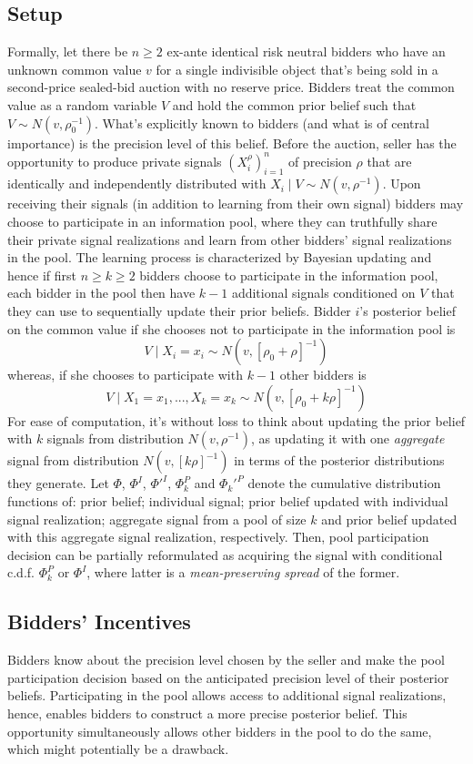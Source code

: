 \subsection*{Setup}
Formally, let there be $n \geq 2$ ex-ante identical risk neutral bidders who have an unknown common value $v$ for a single indivisible object that's being sold in a second-price sealed-bid auction with no reserve price. Bidders treat the common value as a random variable $V$ and hold the common prior belief such that $V \sim N(v,\rho_{0}^{-1})$. What's explicitly known to bidders (and what is of central importance) is the precision level of this belief. Before the auction, seller has the opportunity to produce private signals $(X_{i}^\rho)_{i=1}^n$ of precision $\rho$ that are identically and independently distributed with  $X_i \mid V \sim N(v,\rho^{-1})$. Upon receiving their signals (in addition to learning from their own signal) bidders may choose to participate in an information pool, where they can truthfully share their private signal realizations and learn from other bidders' signal realizations in the pool. The learning process is characterized by Bayesian updating and hence if first $n \geq k \geq 2$ bidders choose to participate in the information pool, each bidder in the pool then have $k-1$ additional signals conditioned on $V$ that they can use to sequentially update their prior beliefs. Bidder $i$'s posterior belief on the common value if she chooses not to participate in the information pool is
\[V \mid X_i=x_i \sim N(v,[\rho_0 + \rho]^{-1})\] 
whereas, if she chooses to participate with $k-1$ other bidders is
\[V \mid X_1=x_1,...,X_k=x_k \sim N(v,[\rho_0 + k\rho]^{-1})\] 
For ease of computation, it's without loss to think about updating the prior belief with $k$ signals from distribution $N(v, \rho^{-1})$, as updating it with one \textit{aggregate} signal from distribution $N(v, [k\rho]^{-1})$ in terms of the posterior distributions they generate. Let $\Phi$, $\Phi^I$, $\Phi'^I$, $\Phi_k^P$ and $ \Phi_k'^P$ denote the cumulative distribution functions of: prior belief; individual signal; prior belief updated with individual signal realization; aggregate signal from a pool of size $k$ and prior belief updated with this aggregate signal realization, respectively. Then, pool participation decision can be partially reformulated as acquiring the signal with conditional c.d.f. $\Phi_k^P$ or $\Phi^I$, where latter is a \textit{mean-preserving spread} of the former.

\subsection*{Bidders' Incentives}
Bidders know about the precision level chosen by the seller and make the pool participation decision based on the anticipated precision level of their posterior beliefs. Participating in the pool allows access to additional signal realizations, hence, enables bidders to construct a more precise posterior belief. This opportunity simultaneously allows other bidders in the pool to do the same, which might potentially be a drawback.

